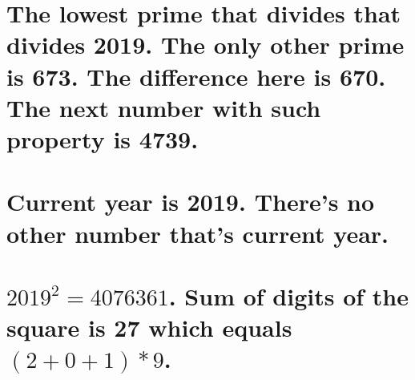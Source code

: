 
\begin{solution}
    \begin{parts}
        \part{
            The lowest prime that divides
            that divides 2019. The only
            other prime is 673. The difference
            here is 670. The next number with
            such property is 4739.
        }
        \part{
            Current year is 2019. There's
            no other number that's current
            year.
        }
        \part{
            $2019^2=4076361$. Sum of digits of
            the square is 27 which equals
            $(2+0+1)*9$.
        }
    \end{parts}
\end{solution}